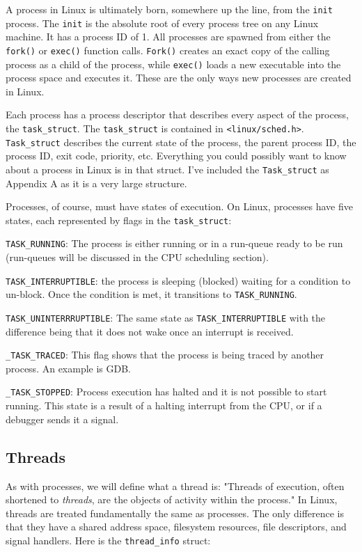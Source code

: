 A process in Linux is ultimately born, somewhere up the line, from the
\texttt{init} process. The \texttt{init} is the absolute root of every process
tree on any Linux machine. It has a process ID of 1. All processes are spawned
from either the \texttt{fork()} or \texttt{exec()} function calls. \texttt{Fork()}
creates an exact copy of the calling process as a child of the process, while
\texttt{exec()} loads a new executable into the process space and executes it.
These are the only ways new processes are created in Linux.

Each process has a process descriptor that describes every aspect of
the process, the \texttt{task\_struct}. The \texttt{task\_struct} is contained
in \texttt{<linux/sched.h>}. \texttt{Task\_struct} describes the current state
of the process, the parent process ID, the process ID, exit code, priority, etc.
Everything you could possibly want to know about a process in Linux is in that
struct. I've included the \texttt{Task\_struct} as Appendix A as it is a very
large structure.

Processes, of course, must have states of execution. On Linux, processes have
five states, each represented by flags in the \texttt{task\_struct}:

\begin{description}
  \item \texttt{TASK\_RUNNING}: The process is either running or in a run-queue
  ready to be run (run-queues will be discussed in the CPU scheduling section).
  \item \texttt{TASK\_INTERRUPTIBLE}: the process is sleeping (blocked) waiting
  for a condition to un-block. Once the condition is met, it transitions to
  \texttt{TASK\_RUNNING}.
  \item \texttt{TASK\_UNINTERRRUPTIBLE}: The same state as \texttt{TASK\_INTERRUPTIBLE}
  with the difference being that it does not wake once an interrupt is received.
  \item \texttt{\_TASK\_TRACED}: This flag shows that the process is being traced
  by another process. An example is GDB.
  \item \texttt{\_TASK\_STOPPED}: Process execution has halted and it is not
  possible to start running. This state is a result of a halting interrupt from
  the CPU, or if a debugger sends it a signal.
\end{description}

  \subsection{Threads}
As with processes, we will define what a thread is: "Threads of execution, often
shortened to \textit{threads}, are the objects of activity within the process."
\cite{robertlove2010} In Linux, threads are treated fundamentally the same as
processes. The only difference is that they have a shared address space,
filesystem resources, file descriptors, and signal handlers. Here is the
\texttt{thread\_info} struct:\cite{robertlove2010}

